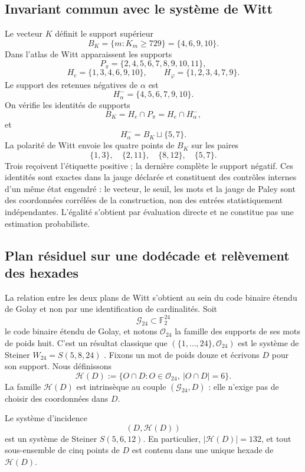\subsection{Invariant commun avec le système de Witt}

Le vecteur \(K\) définit le support supérieur
\[
B_K=\{m:K_m\ge729\}=\{4,6,9,10\}.
\]
Dans l'atlas de Witt apparaissent les supports
\[
P_\pi=\{2,4,5,6,7,8,9,10,11\},
\]
\[
H_e=\{1,3,4,6,9,10\},
\qquad
H_\varphi=\{1,2,3,4,7,9\}.
\]
Le support des retenues négatives de \(\alpha\) est
\[
H_\alpha^-=\{4,5,6,7,9,10\}.
\]
On vérifie les identités de supports
\[
\boxed{
B_K=H_e\cap P_\pi=H_e\cap H_\alpha^-,}
\]
et
\[
\boxed{H_\alpha^-=B_K\sqcup\{5,7\}.}
\]
La polarité de Witt envoie les quatre points de \(B_K\) sur les paires
\[
\{1,3\},\quad\{2,11\},\quad\{8,12\},\quad\{5,7\}.
\]
Trois reçoivent l'étiquette positive ; la dernière complète le support négatif.
Ces identités sont exactes dans la jauge déclarée et constituent des contrôles
internes d'un même état engendré : le vecteur, le seuil, les mots et la
jauge de Paley sont des coordonnées corrélées de la construction, non des
entrées statistiquement indépendantes. L'égalité s'obtient par
évaluation directe et ne constitue pas une estimation probabiliste.

\subsection{Plan résiduel sur une dodécade et relèvement des hexades}
\label{p12-83-c17-s1:sec:w12-w24-elevacion}

La relation entre les deux plans de Witt s'obtient au sein du code
binaire étendu de Golay et non par une identification de cardinalités.
Soit
\[
\mathcal G_{24}\subset\mathbb F_2^{24}
\]
le code binaire étendu de Golay, et notons \(\mathcal O_{24}\) la famille
des supports de ses mots de poids huit. C'est un résultat classique que
\((\{1,\ldots,24\},\mathcal O_{24})\) est le système de Steiner
\(W_{24}=S(5,8,24)\) \cite{MacWilliamsSloane1977,ConwaySloane1999}.
Fixons un mot de poids douze et écrivons \(D\) pour son support. Nous définissons
\begin{equation}
 \mathcal H(D)
 :=\{O\cap D:O\in\mathcal O_{24},\ |O\cap D|=6\}.
 \label{p12-83-c17-s1:eq:hexadas-residuales-dodecada}
\end{equation}
La famille \(\mathcal H(D)\) est intrinsèque au couple
\((\mathcal G_{24},D)\) : elle n'exige pas de choisir des coordonnées dans \(D\).

\begin{theorem}
\label{p12-83-c17-s1:thm:dodecada-w12}
Le système d'incidence
\[
 (D,\mathcal H(D))
\]
est un système de Steiner \(S(5,6,12)\). En particulier,
\(|\mathcal H(D)|=132\), et tout sous-ensemble de cinq points de \(D\) est
contenu dans une unique hexade de \(\mathcal H(D)\).
\end{theorem}

